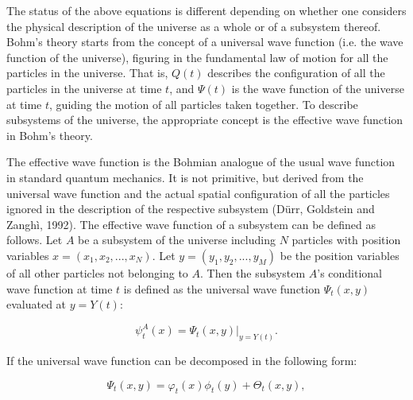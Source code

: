 The status of the above equations is different depending on whether one considers the physical description of the universe as a whole or of a subsystem thereof. Bohm's theory starts from the concept of a universal wave function (i.e. the wave function of the universe), figuring in the fundamental law of motion for all the particles in the universe. That is, $Q(t)$ describes the configuration of all the particles in the universe at time $t$, and $\Psi(t)$ is the wave function of the universe at time $t$, guiding the motion of all particles taken together. To describe subsystems of the universe, the appropriate concept is the effective wave function in Bohm's theory.

The effective wave function is the Bohmian analogue of the usual wave function in standard quantum mechanics. It is not primitive, but derived from the universal wave function and the actual spatial configuration of all the particles ignored in the description of the respective subsystem (D\"{u}rr, Goldstein and Zangh\`{i}, 1992). The effective wave function of a subsystem can be defined as follows. Let $A$ be a subsystem of the universe including $N$ particles with position variables $x=(x_1,x_2,...,x_N)$. Let $y=(y_1,y_2,...,y_M)$ be the position variables of all other particles not belonging to $A$. Then the subsystem $A$'s conditional wave function at time $t$ is defined as the universal wave function $\Psi_t(x, y)$ evaluated at $y = Y(t)$:

\begin{equation}
\psi_t^A(x)=\Psi_t(x, y)|_{y=Y(t)}.
\end{equation}

\noindent If the universal wave function can be decomposed in the following form:

\begin{equation}\label{EF}
\Psi_t(x, y)=\varphi_t(x)\phi_t(y)+\Theta_t(x, y),
\end{equation}

